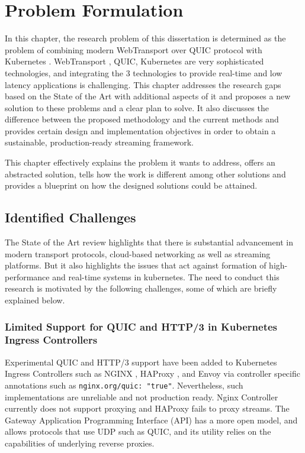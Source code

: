 \chapter{Problem Formulation}

In this chapter, the research problem of this dissertation is determined as the problem of combining modern WebTransport over QUIC protocol \cite{rfc9000} with Kubernetes \cite{kubernetes-docs}. WebTransport \cite{webtransport-draft}, QUIC, Kubernetes are very sophisticated technologies, and integrating the 3 technologies to provide real-time and low latency applications is challenging. This chapter addresses the research gaps based on the State of the Art with additional aspects of it and proposes a new solution to these problems and a clear plan to solve. It also discusses the difference between the proposed methodology and the current methods and provides certain design and implementation objectives in order to obtain a sustainable, production-ready streaming framework.

This chapter effectively explains the problem it wants to address, offers an abstracted solution, tells how the work is different among other solutions and provides a blueprint on how the designed solutions could be attained.

\section{Identified Challenges}
The State of the Art review highlights that there is substantial advancement in modern transport protocols, cloud-based networking as well as streaming platforms. But it also highlights the issues that act against formation of high-performance and real-time systems in kubernetes. The need to conduct this research is motivated by the following challenges, some of which are briefly explained below.

\subsection{Limited Support for QUIC and HTTP/3 in Kubernetes Ingress Controllers}
Experimental QUIC and HTTP/3 support have been added to Kubernetes Ingress Controllers such as NGINX \cite{nginx-ingress-docs}, HAProxy \cite{haproxy-docs}, and Envoy \cite{envoy-proxy} via controller specific annotations such as \texttt{nginx.org/quic: "true"}. Nevertheless, such implementations are unreliable and not production ready. Nginx Controller currently does not support proxying and HAProxy fails to proxy streams. The Gateway Application Programming Interface (API) \cite{gateway-api} has a more open model, and allows protocols that use UDP such as QUIC, and its utility relies on the capabilities of underlying reverse proxies.

